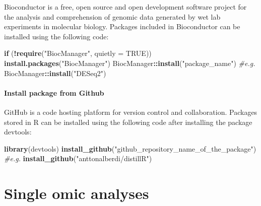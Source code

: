 \documentclass[
]{book}
\newenvironment{Shaded}{\begin{snugshade}}{\end{snugshade}}
\newcommand{\AttributeTok}[1]{\textcolor[rgb]{0.13,0.29,0.53}{#1}}
\newcommand{\CommentTok}[1]{\textcolor[rgb]{0.56,0.35,0.01}{\textit{#1}}}
\newcommand{\ConstantTok}[1]{\textcolor[rgb]{0.56,0.35,0.01}{#1}}
\newcommand{\ControlFlowTok}[1]{\textcolor[rgb]{0.13,0.29,0.53}{\textbf{#1}}}
\newcommand{\FunctionTok}[1]{\textcolor[rgb]{0.13,0.29,0.53}{\textbf{#1}}}
\newcommand{\NormalTok}[1]{#1}
\newcommand{\SpecialCharTok}[1]{\textcolor[rgb]{0.81,0.36,0.00}{\textbf{#1}}}
\newcommand{\StringTok}[1]{\textcolor[rgb]{0.31,0.60,0.02}{#1}}
\begin{document}
Bioconductor is a free, open source and open development software project for the analysis and comprehension of genomic data generated by wet lab experiments in molecular biology. Packages included in Bioconductor can be installed using the following code:

\small

\begin{Shaded}
\begin{Highlighting}[]
\ControlFlowTok{if}\NormalTok{ (}\SpecialCharTok{!}\FunctionTok{require}\NormalTok{(}\StringTok{"BiocManager"}\NormalTok{, }\AttributeTok{quietly =} \ConstantTok{TRUE}\NormalTok{))}
    \FunctionTok{install.packages}\NormalTok{(}\StringTok{"BiocManager"}\NormalTok{)}
\NormalTok{BiocManager}\SpecialCharTok{::}\FunctionTok{install}\NormalTok{(}\StringTok{"package\_name"}\NormalTok{)}
\CommentTok{\#e.g.}
\NormalTok{BiocManager}\SpecialCharTok{::}\FunctionTok{install}\NormalTok{(}\StringTok{"DESeq2"}\NormalTok{)}
\end{Highlighting}
\end{Shaded}

\normalsize

\hypertarget{install-package-from-github}{%
\subsubsection*{Install package from Github}\label{install-package-from-github}}

GitHub is a code hosting platform for version control and collaboration. Packages stored in R can be installed using the following code after installing the package devtools:

\small

\begin{Shaded}
\begin{Highlighting}[]
\FunctionTok{library}\NormalTok{(devtools)}
\FunctionTok{install\_github}\NormalTok{(}\StringTok{"github\_repository\_name\_of\_the\_package"}\NormalTok{)}
\CommentTok{\#e.g.}
\FunctionTok{install\_github}\NormalTok{(}\StringTok{"anttonalberdi/distillR"}\NormalTok{)}
\end{Highlighting}
\end{Shaded}

\normalsize

\hypertarget{single-omic-analyses}{%
\chapter{Single omic analyses}\label{single-omic-analyses}}
\end{document}
